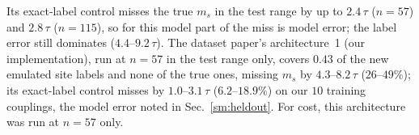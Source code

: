 \documentclass[aps,prx,onecolumn,10pt,nofootinbib,longbibliography,floatfix]{revtex4-2}
\theoremstyle{remark}
\newcommand{\ms}{m_s}
\begin{document}
Its exact-label control misses the true $\ms$ in the test range by up to $2.4\,\tau$ ($n=57$) and $2.8\,\tau$ %
($n=115$), so for this model part of the miss is model error; the label error still dominates ($4.4$--$9.2\,\tau$). %
The dataset paper's architecture~1 (our implementation), %
run at $n=57$ in the test range only, covers $0.43$ of the new emulated site labels %
and none of the true ones, missing $\ms$ by $4.3$--$8.2\,\tau$ ($26$--$49\%$); its exact-label control misses by %
$1.0$--$3.1\,\tau$ ($6.2$--$18.9\%$) on our $10$ training couplings, the model error noted in Sec.~\ref{sm:heldout}. %
For cost, this architecture was run at $n=57$ only. %
\end{document}
